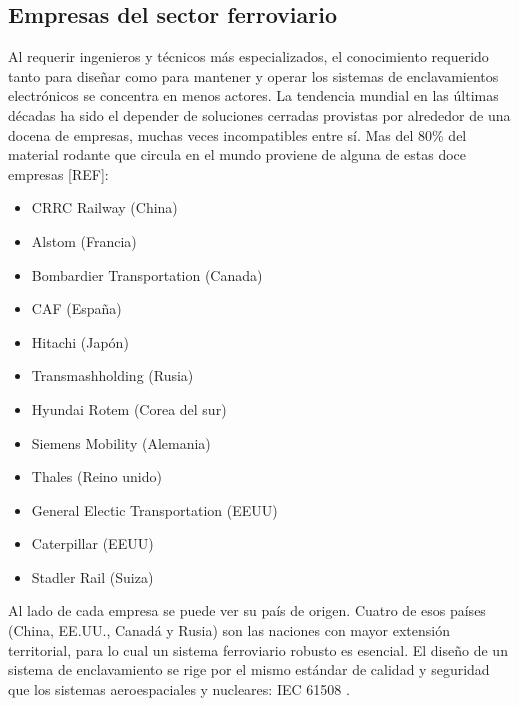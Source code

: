 \subsection{Empresas del sector ferroviario}

    Al requerir ingenieros y técnicos más especializados, el conocimiento requerido tanto para diseñar como para mantener y operar los sistemas de enclavamientos electrónicos se concentra en menos actores. La tendencia mundial en las últimas décadas ha sido el depender de soluciones cerradas provistas por alrededor de una docena de empresas, muchas veces incompatibles entre sí. Mas del 80\% del material rodante que circula en el mundo proviene de alguna de estas doce empresas [REF]:

    \begin{itemize}
        \item CRRC Railway (China)
        \item Alstom (Francia)
        \item Bombardier Transportation (Canada)
        \item CAF (España)
        \item Hitachi (Japón)
        \item Transmashholding (Rusia)
        \item Hyundai Rotem (Corea del sur)
        \item Siemens Mobility (Alemania)
        \item Thales (Reino unido)
        \item General Electic Transportation (EEUU)
        \item Caterpillar (EEUU)
        \item Stadler Rail (Suiza)
    \end{itemize}
    
    Al lado de cada empresa se puede ver su país de origen. Cuatro de esos países (China, EE.UU., Canadá y Rusia) son las naciones con mayor extensión territorial, para lo cual un sistema ferroviario robusto es esencial. El diseño de un sistema de enclavamiento se rige por el mismo estándar de calidad y seguridad que los sistemas aeroespaciales y nucleares: IEC 61508 \cite{Paper_71,Paper_72,Paper_73,Paper_74,Paper_75,Paper_76,Paper_77}.

    